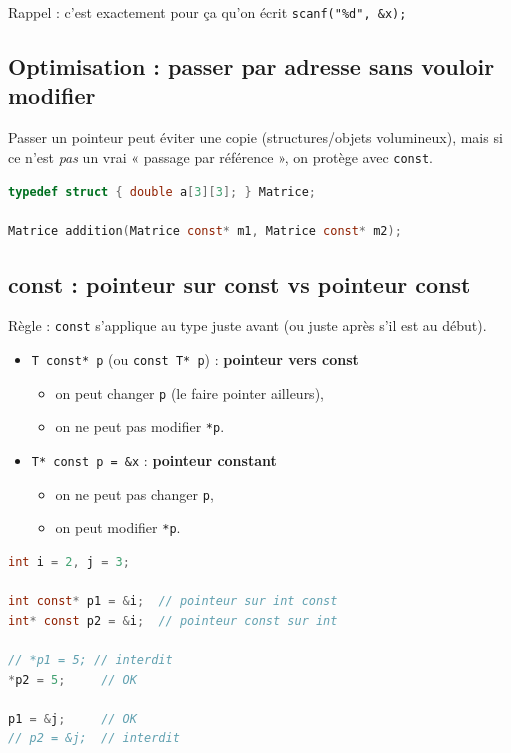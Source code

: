 Rappel : c’est exactement pour ça qu’on écrit \texttt{scanf("\%d", \&x);} 

\subsection{Optimisation : passer par adresse sans vouloir modifier}
Passer un pointeur peut éviter une copie (structures/objets volumineux), mais si ce
n’est \emph{pas} un vrai « passage par référence », on protège avec \texttt{const}. 

\begin{lstlisting}[language=C]
typedef struct { double a[3][3]; } Matrice;

Matrice addition(Matrice const* m1, Matrice const* m2);
\end{lstlisting}

\subsection{const : pointeur sur const vs pointeur const}
Règle : \texttt{const} s’applique au type juste avant (ou juste après s’il est au début). 

\begin{itemize}
  \item \texttt{T const* p} (ou \texttt{const T* p}) : \textbf{pointeur vers const}
  \begin{itemize}
    \item on peut changer \texttt{p} (le faire pointer ailleurs),
    \item on ne peut pas modifier \texttt{*p}.
  \end{itemize}
  \item \texttt{T* const p = \&x} : \textbf{pointeur constant}
  \begin{itemize}
    \item on ne peut pas changer \texttt{p},
    \item on peut modifier \texttt{*p}.
  \end{itemize}
\end{itemize}

\begin{lstlisting}[language=C]
int i = 2, j = 3;

int const* p1 = &i;  // pointeur sur int const
int* const p2 = &i;  // pointeur const sur int

// *p1 = 5; // interdit
*p2 = 5;     // OK

p1 = &j;     // OK
// p2 = &j;  // interdit
\end{lstlisting}

